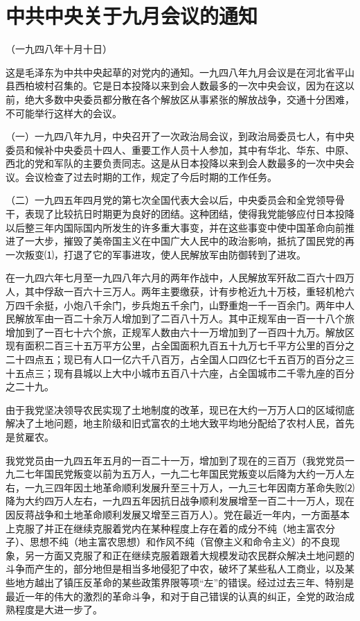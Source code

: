 \documentclass[UTF-8, a5paper, 12pt]{ctexart}
\begin{document}
\section{中共中央关于九月会议的通知}

（一九四八年十月十日）

这是毛泽东为中共中央起草的对党内的通知。一九四八年九月会议是在河北省平山县西柏坡村召集的。它是日本投降以来到会人数最多的一次中央会议，因为在这以前，绝大多数中央委员都分散在各个解放区从事紧张的解放战争，交通十分困难，不可能举行这样大的会议。

（一）一九四八年九月，中央召开了一次政治局会议，到政治局委员七人，有中央委员和候补中央委员十四人、重要工作人员十人参加，其中有华北、华东、中原、西北的党和军队的主要负责同志。这是从日本投降以来到会人数最多的一次中央会议。会议检查了过去时期的工作，规定了今后时期的工作任务。

（二）一九四五年四月党的第七次全国代表大会以后，中央委员会和全党领导骨干，表现了比较抗日时期更为良好的团结。这种团结，使得我党能够应付日本投降以后整三年内国际国内所发生的许多重大事变，并在这些事变中使中国革命向前推进了一大步，摧毁了美帝国主义在中国广大人民中的政治影响，抵抗了国民党的再一次叛变⑴，打退了它的军事进攻，使人民解放军由防御转到了进攻。

在一九四六年七月至一九四八年六月的两年作战中，人民解放军歼敌二百六十四万人，其中俘敌一百六十三万人。两年主要缴获，计有步枪近九十万枝，重轻机枪六万四千余挺，小炮八千余门，步兵炮五千余门，山野重炮一千一百余门。两年中人民解放军由一百二十余万人增加到了二百八十万人。其中正规军由一百一十八个旅增加到了一百七十六个旅，正规军人数由六十一万增加到了一百四十九万。解放区现有面积二百三十五万平方公里，占全国面积九百五十九万七千平方公里的百分之二十四点五；现已有人口一亿六千八百万，占全国人口四亿七千五百万的百分之三十五点三；现有县城以上大中小城市五百八十六座，占全国城市二千零九座的百分之二十九。

由于我党坚决领导农民实现了土地制度的改革，现已在大约一万万人口的区域彻底解决了土地问题，地主阶级和旧式富农的土地大致平均地分配给了农村人民，首先是贫雇农。

我党党员由一九四五年五月的一百二十一万，增加到了现在的三百万（我党党员一九二七年国民党叛变以前为五万人，一九二七年国民党叛变以后降为大约一万人左右，一九三四年因土地革命顺利发展升至三十万人，一九三七年因南方革命失败⑵降为大约四万人左右，一九四五年因抗日战争顺利发展增至一百二十一万人，现在因反蒋战争和土地革命顺利发展又增至三百万人）。党在最近一年内，一方面基本上克服了并正在继续克服着党内在某种程度上存在着的成分不纯（地主富农分子）、思想不纯（地主富农思想）和作风不纯（官僚主义和命令主义）的不良现象，另一方面又克服了和正在继续克服着跟着大规模发动农民群众解决土地问题的斗争而产生的，部分地但是相当多地侵犯了中农，破坏了某些私人工商业，以及某些地方越出了镇压反革命的某些政策界限等项“左”的错误。经过过去三年、特别是最近一年的伟大的激烈的革命斗争，和对于自己错误的认真的纠正，全党的政治成熟程度是大进一步了。
\end{document}
